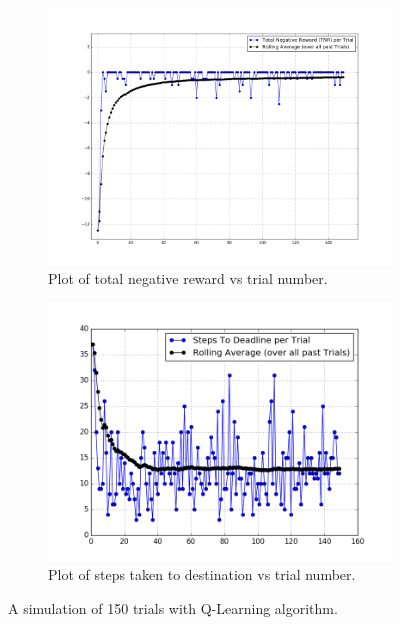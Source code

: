 \documentclass[paper=a4, fontsize=11pt]{scrartcl}
\numberwithin{equation}{section}		%
\numberwithin{figure}{section}			%
\numberwithin{table}{section}				%
\begin{document}
 \begin{figure}
 	\centering
 	\begin{subfigure}{.6\textwidth}
 		\centering
 		\includegraphics[width= \linewidth]{4_TNR}
 		\caption{Plot of total negative reward   vs trial number.}
 		\label{fig:sub1}
 	\end{subfigure}%
 	\begin{subfigure}{.6\textwidth}
 		\centering
 		\includegraphics[width= \linewidth]{4_STD}
 		\caption{Plot of steps taken to destination vs trial number.}
 		\label{fig:sub2}
 	\end{subfigure}
 	\caption{A simulation of 150 trials with Q-Learning algorithm.   }
 	\label{fig:test}
 \end{figure} 
 
\end{document}
